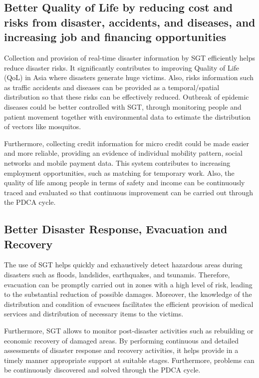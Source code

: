 \subsection{Better Quality of Life by reducing cost and risks from disaster, accidents, and diseases, and increasing job and financing opportunities}

\tab Collection and provision of real-time disaster information by SGT efficiently helps reduce disaster risks. It significantly contributes to improving Quality of Life (QoL) in Asia where disasters generate huge victims. Also, risks information such as traffic accidents and diseases can be provided as a temporal/spatial distribution so that these risks can be effectively reduced.  Outbreak of epidemic diseases could be better controlled with SGT, through monitoring people and patient movement together with environmental data to estimate the distribution of vectors like mosquitos.

Furthermore, collecting credit information for micro credit could be made easier and more reliable, providing an evidence of individual mobility pattern, social networks and mobile payment data. This system contributes to increasing employment opportunities, such as matching for temporary work. Also, the quality of life among people in terms of safety and income can be continuously traced and evaluated so that continuous improvement can be carried out through the PDCA cycle.

\subsection{Better Disaster Response, Evacuation and Recovery}

\tab The use of SGT helps quickly and exhaustively detect hazardous areas during disasters such as floods, landslides, earthquakes, and tsunamis. Therefore, evacuation can be promptly carried out in zones with a high level of risk, leading to the substantial reduction of possible damages. Moreover, the knowledge of the distribution and condition of evacuees facilitates the efficient provision of medical services and distribution of necessary items to the victims.

Furthermore, SGT allows to monitor post-disaster activities such as rebuilding or economic recovery of damaged areas. By performing continuous and detailed assessments of disaster response and recovery activities, it helps provide in a timely manner appropriate support at suitable stages. Furthermore, problems can be continuously discovered and solved through the PDCA cycle.

